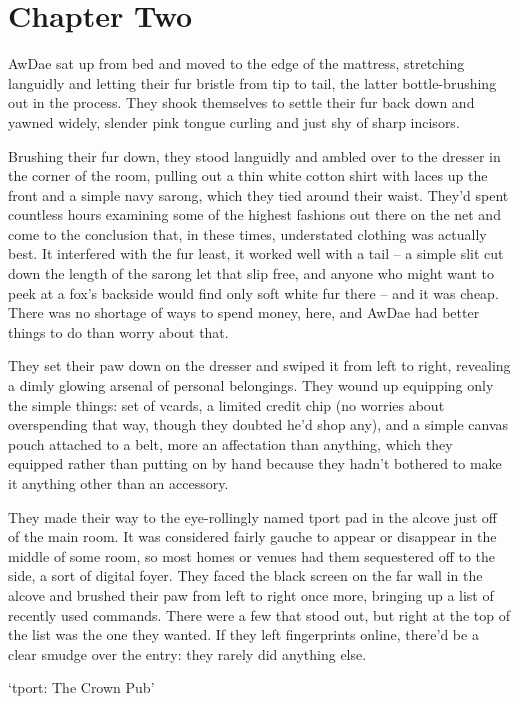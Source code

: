 \chapter{Chapter Two}

AwDae sat up from bed and moved to the edge of the mattress, stretching languidly and letting their fur bristle from tip to tail, the latter bottle-brushing out in the process.  They shook themselves to settle their fur back down and yawned widely, slender pink tongue curling and just shy of sharp incisors.

Brushing their fur down, they stood languidly and ambled over to the dresser in the corner of the room, pulling out a thin white cotton shirt with laces up the front and a simple navy sarong, which they tied around their waist.  They'd spent countless hours examining some of the highest fashions out there on the net and come to the conclusion that, in these times, understated clothing was actually best.  It interfered with the fur least, it worked well with a tail -- a simple slit cut down the length of the sarong let that slip free, and anyone who might want to peek at a fox's backside would find only soft white fur there -- and it was cheap.  There was no shortage of ways to spend money, here, and AwDae had better things to do than worry about that.

They set their paw down on the dresser and swiped it from left to right, revealing a dimly glowing arsenal of personal belongings.  They wound up equipping only the simple things: set of vcards, a limited credit chip (no worries about overspending that way, though they doubted he'd shop any), and a simple canvas pouch attached to a belt, more an affectation than anything, which they equipped rather than putting on by hand because they hadn't bothered to make it anything other than an accessory.

They made their way to the eye-rollingly named tport pad in the alcove just off of the main room.  It was considered fairly gauche to appear or disappear in the middle of some room, so most homes or venues had them sequestered off to the side, a sort of digital foyer.  They faced the black screen on the far wall in the alcove and brushed their paw from left to right once more, bringing up a list of recently used commands.  There were a few that stood out, but right at the top of the list was the one they wanted.  If they left fingerprints online, there'd be a clear smudge over the entry: they rarely did anything else.

`tport: The Crown Pub'

